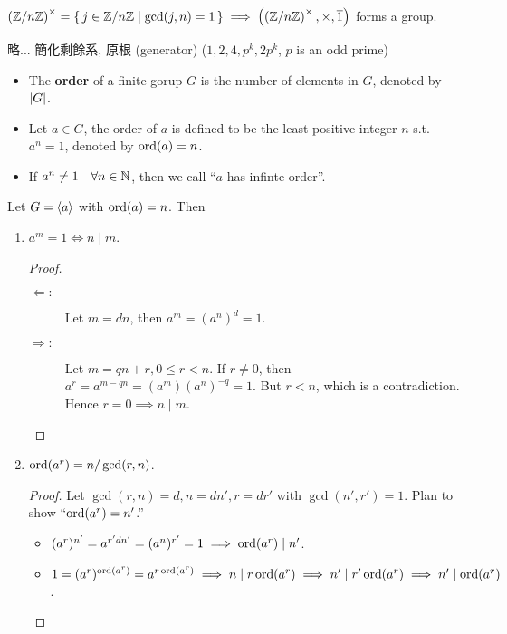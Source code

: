 \begin{definition}
  $\left( {\mathbb{Z}}/{n\mathbb{Z}} \right)^\times = \{\, j \in {\mathbb{Z}}/{n\mathbb{Z}} \mid
  \gcd(j,n) = 1 \,\} \implies \left(\left( {\mathbb{Z}}/{n\mathbb{Z}} \right)^\times,
  \times, \overline{1} \right)$ forms a group.
\end{definition}

\begin{example}
  略... 簡化剩餘系, 原根 (generator) ($1, 2, 4, p^k, 2p^k$, $p$ is an odd prime)
\end{example}

\begin{definition} \mbox{}
  \begin{itemize}
    \item The {\bf order} of a finite gorup $G$ is the number of elements in
      $G$, denoted by $\lvert G\rvert$.
    \item Let $a \in G$, the order of $a$ is defined to be the least positive
      integer $n$ s.t. $a^n = 1$, denoted by $\operatorname{ord}(a) = n$.
    \item If $a^n \ne 1 \quad \forall n \in \mathbb{N}$, then we call
      ``$a$ has infinte order''.
  \end{itemize}
\end{definition}

\begin{prop}
  Let $G = \langle a\rangle$ with $\operatorname{ord}(a) = n$. Then
  \begin{enumerate}
    \item $a^m = 1 \iff n \mid m$.
      \begin{proof} \mbox{}
        \begin{description}
          \item[$\Leftarrow:$] Let $m = dn$, then $a^m = (a^n)^d = 1$.
          \item[$\Rightarrow:$] Let $m = qn + r, 0 \le r < n$.
            If $r \ne 0$, then $a^r = a^{m - qn} = (a^m)(a^n)^{-q} = 1$.
            But $r < n$, which is a contradiction.
            Hence $r = 0 \implies n \mid m$. \qedhere
        \end{description}
      \end{proof}
    \item $\operatorname{ord}(a^r) = n / \gcd(r, n)$.
      \begin{proof}
        Let $\gcd(r, n) = d, n = dn', r = dr'$ with $\gcd(n', r') = 1$.
        Plan to show ``$\operatorname{ord}(a^r) = n'$.''
        \begin{itemize}
          \item $(a^r)^{n'} = a^{r'dn'} = (a^n)^{r'} = 1 \implies \operatorname{ord}(a^r) \mid n'$.
          \item $1 = (a^r)^{\operatorname{ord}(a^r)} = a^{r \operatorname{ord}(a^r)} \implies
            n \mid r \operatorname{ord}(a^r) \implies n' \mid r' \operatorname{ord}(a^r) \implies
            n' \mid \operatorname{ord}(a^r)$.
        \end{itemize}
      \end{proof}
  \end{enumerate}
\end{prop}

